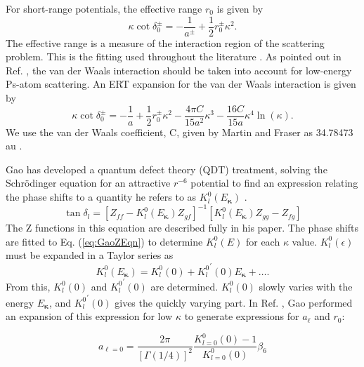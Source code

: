 \documentclass[preprint,showpacs,preprintnumbers,amsmath,amssymb,longbibliography,pra,aps]{revtex4-1}
\begin{document}
For short-range potentials, the effective range $r_0$ is given by \cite{Bethe1949,Blatt1949}
\begin{equation}
\label{eq:EffectiveRangeShort}
\kappa \cot\delta_0^\pm = -\frac{1}{a^\pm} + \frac{1}{2} r_0^\pm \kappa^2.
\end{equation}
The effective range is a measure of the interaction region of the scattering problem. This is the fitting used throughout the literature \cite{Ivanov2002,VanReeth2003,Blackwood2002,Walters2004}. As pointed out in Ref. \cite{Fabrikant2014}, the van der Waals interaction should be taken into account for low-energy Ps-atom scattering. An ERT expansion for the van der Waals interaction is given by \cite{Drake2006}
\begin{equation}
\label{eq:EffectiveRangeLongAu}
\kappa \cot\delta_0^\pm = -\frac{1}{a} + \frac{1}{2} r_0^\pm \kappa^2 - \frac{4 \pi C}{15 a^2} \kappa^3 - \frac{16 C}{15 a} \kappa^4 \ln \left(\kappa \right).
\end{equation}
We use the van der Waals coefficient, C, given by Martin and Fraser as 34.78473 au \cite{Martin1980}.

Gao has developed a quantum defect theory (QDT) treatment, solving the Schr\"{o}dinger equation for an attractive $r^{-6}$ potential to find an expression relating the phase shifts to a quantity he refers to as $K_l^0(E_{\bm \kappa})$ \cite{Gao1998}.
\begin{equation}
\label{eq:GaoZEqn}
\tan\delta_l = [Z_{ff} - K_l^0(E_{\bm \kappa}) Z_{gf}]^{-1} [K_l^0(E_{\bm \kappa}) Z_{gg} - Z_{fg}]
\end{equation}
The Z functions in this equation are described fully in his paper. The phase shifts are fitted to Eq. (\ref{eq:GaoZEqn}) to determine $K_l^0(E)$ for each $\kappa$ value. $K_l^0(\epsilon)$ must be expanded in a Taylor series as
\begin{equation}
\label{eq:GaoKTaylor}
K_l^0(E_{\bm \kappa}) = K_l^0(0) + {K_l^0}^\prime(0) E_{\bm \kappa} + \ldots.
\end{equation}
From this, $K_l^0(0)$ and ${K_l^0}^\prime(0)$ are determined. $K_l^0(0)$ slowly varies with the energy $E_{\bm \kappa}$, and ${K_l^0}^\prime(0)$ gives the quickly varying part. In Ref. \cite{Gao1998a}, Gao performed an expansion of this expression for low $\kappa$ to generate expressions for $a_\ell$ and $r_0$:

\begin{equation}
\label{eq:GaoScatLenS}
a_{\ell=0} = \frac{2\pi}{[\Gamma(1/4)]^2} \frac{K_{l=0}^0(0) - 1}{K_{l=0}^0(0)} \beta_6
\end{equation}
\end{document}
